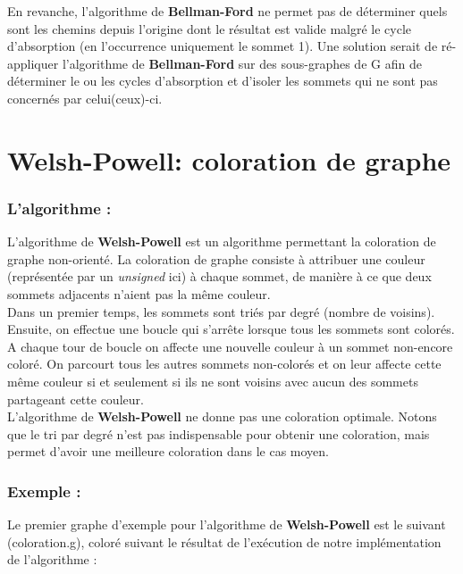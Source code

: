 \documentclass[12pt]{article}
\begin{document}
En revanche, l'algorithme de {\bf Bellman-Ford} ne permet pas de déterminer quels sont les chemins depuis l'origine dont le résultat est valide malgré le cycle d'absorption (en l'occurrence uniquement le sommet 1). Une solution serait de ré-appliquer l'algorithme de {\bf Bellman-Ford} sur des sous-graphes de G afin de déterminer le ou les cycles d'absorption et d'isoler les sommets qui ne sont pas concernés par celui(ceux)-ci.\\

\clearpage
\section{Welsh-Powell: coloration de graphe}
\subsubsection{L'algorithme :}
L'algorithme de {\bf Welsh-Powell} est un algorithme permettant la coloration de graphe non-orienté. La coloration de graphe consiste à attribuer une couleur (représentée par un {\it unsigned} ici) à chaque sommet, de manière à ce que deux sommets adjacents n'aient pas la même couleur.\\

Dans un premier temps, les sommets sont triés par degré (nombre de voisins). Ensuite, on effectue une boucle qui s'arrête lorsque tous les sommets sont colorés.\\ 
 A chaque tour de boucle on affecte une nouvelle couleur à un sommet non-encore coloré. On parcourt tous les autres sommets non-colorés et on leur affecte cette même couleur si et seulement si ils ne sont voisins avec aucun des sommets partageant cette couleur.\\
 
L'algorithme de {\bf Welsh-Powell} ne donne pas une coloration optimale. Notons que le tri par degré n'est pas indispensable pour obtenir une coloration, mais permet d'avoir une meilleure coloration dans le cas moyen.\\

\subsubsection{Exemple :}

Le premier graphe d'exemple pour l'algorithme de {\bf Welsh-Powell} est le suivant (coloration.g), coloré suivant le résultat de l'exécution de notre implémentation de l'algorithme :\\
\end{document}
